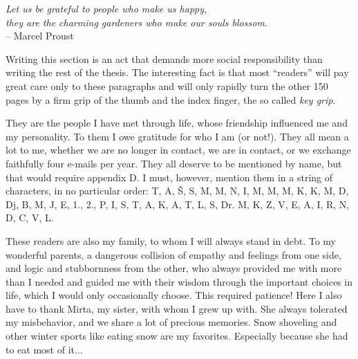 \cleardoublepage


\begin{acknowledgements}

\narrowlinespacing
\begin{myquote}
\begin{flushright}
\textit{Let us be grateful to people who make us happy,\\they are the charming gardeners who make our souls blossom.} \\-- Marcel Proust
\end{flushright}
\end{myquote}
\normallinespacing

Writing this section is an act that demands more social responsibility than writing the rest of the thesis. The interesting fact is that most “readers” will pay great care only to these paragraphs and will only rapidly turn the other 150 pages by a firm grip of the thumb and the index finger, the so called \emph{key grip}.

They are the people I have met through life, whose friendship influenced me and my personality. To them I owe gratitude for who I am (or not!). They all mean a lot to me, whether we are no longer in contact, we are in contact, or we exchange faithfully four e-mails per year. They all deserve to be mentioned by name, but that would require appendix D. I must, however, mention them in a string of characters, in no particular order: T, A, Š, S, M, M, N, I, M, M, M, K, K, M, D, Dj, B, M, J, E, 1., 2., P, I, S, T, A, K, A, T, L, S, Dr. M, K, Z, V, E, A, I, R, N, D, C, V, L.

These readers are also my family, to whom I will always stand in debt. To my wonderful parents, a dangerous collision of empathy and feelings from one side, and logic and stubbornness from the other, who always provided me with more than I needed and guided me with their wisdom through the important choices in life, which I would only occasionally choose. This required patience! Here I also have to thank Mirta, my sister, with whom I grew up with. She always tolerated my misbehavior, and we share a lot of precious memories. Snow shoveling and other winter sports like eating snow are my favorites. Especially because she had to eat most of it...


\end{acknowledgements}
